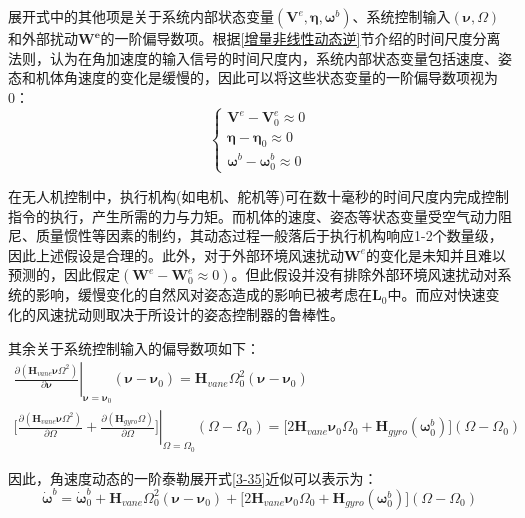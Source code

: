 展开式中的其他项是关于系统内部状态变量$(\boldsymbol{V}^e,\boldsymbol{\eta},\boldsymbol{\omega}^b)$、系统控制输入$(\boldsymbol{\nu},\Omega)$和外部扰动$\boldsymbol{W^e}$的一阶偏导数项。根据\ref{增量非线性动态逆}节介绍的时间尺度分离法则，认为在角加速度的输入信号的时间尺度内，系统内部状态变量包括速度、姿态和机体角速度的变化是缓慢的，因此可以将这些状态变量的一阶偏导数项视为0：
\begin{equation}
    \begin{cases}
        \boldsymbol{V}^e-\boldsymbol{V}_0^e\approx0 \\
        \boldsymbol{\eta}-\boldsymbol{\eta}_0\approx0 \\
        \boldsymbol{\omega}^b-\boldsymbol{\omega}_0^b\approx0
    \end{cases}
    \label{3-37}
\end{equation}

在无人机控制中，执行机构(如电机、舵机等)可在数十毫秒的时间尺度内完成控制指令的执行，产生所需的力与力矩。而机体的速度、姿态等状态变量受空气动力阻尼、质量惯性等因素的制约，其动态过程一般落后于执行机构响应1-2个数量级，因此上述假设是合理的。此外，对于外部环境风速扰动$\boldsymbol{W}^e$的变化是未知并且难以预测的，因此假定$(\boldsymbol{W}^e-\boldsymbol{W}_0^e\approx0)$。但此假设并没有排除外部环境风速扰动对系统的影响，缓慢变化的自然风对姿态造成的影响已被考虑在$\boldsymbol{L}_0$中。而应对快速变化的风速扰动则取决于所设计的姿态控制器的鲁棒性。

其余关于系统控制输入的偏导数项如下：
\begin{equation}
    \begin{gathered}
    \left.\frac{\partial(\boldsymbol{H}_{vane}\boldsymbol{\nu}\Omega^2)}{\partial\boldsymbol{\nu}}\right|_{\boldsymbol{\nu}=\boldsymbol{\nu}_0}(\boldsymbol{\nu}-\boldsymbol{\nu}_0)=\boldsymbol{H}_{vane}\Omega_0^2(\boldsymbol{\nu}-\boldsymbol{\nu}_0) \\
    \left.\bigg[\frac{\partial(\boldsymbol{H}_{vane}\boldsymbol{\nu}\Omega^2)}{\partial\Omega}+\frac{\partial(\boldsymbol{H}_{gyro}\Omega)}{\partial\Omega}\bigg]\right|_{\Omega=\Omega_0}(\Omega-\Omega_0)=\big[2\boldsymbol{H}_{vane}\boldsymbol{\nu}_0\Omega_0+\boldsymbol{H}_{gyro}(\boldsymbol{\omega}_0^b)\big](\Omega-\Omega_0)
    \end{gathered}
    \label{3-38}
\end{equation}

因此，角速度动态的一阶泰勒展开式\eqref{3-35}近似可以表示为：
\begin{equation}
    \boldsymbol{\dot{\omega}}^b=\boldsymbol{\dot{\omega}}_0^b+\boldsymbol{H}_{vane}\Omega_0^2(\boldsymbol{\nu}-\boldsymbol{\nu}_0)+\big[2\boldsymbol{H}_{vane}\boldsymbol{\nu}_0\Omega_0+\boldsymbol{H}_{gyro}(\boldsymbol{\omega}_0^b)\big](\Omega-\Omega_0)
    \label{3-39}
\end{equation}

